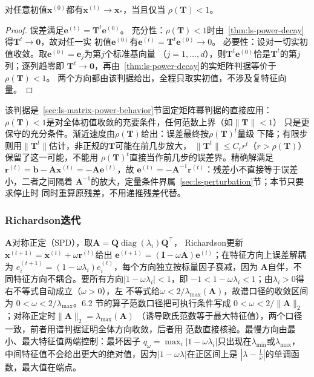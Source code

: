 \begin{theorem}[定常迭代的收敛判据]
\label{thm:ls-stationary-convergence}
对任意初值$\bm x^{(0)}$都有$\bm x^{(t)}\to\bm x_*$，当且仅当
$\rho(\bm T)<1$。
\end{theorem}
\begin{proof}
误差满足$\bm e^{(t)}=\bm T^t\bm e^{(0)}$。
充分性：$\rho(\bm T)<1$时由~\ref{thm:ls-power-decay}得$\bm T^t\to\bm0$，故对任一实
初值$\bm e^{(0)}$有$\bm e^{(t)}=\bm T^t\bm e^{(0)}\to0$。
必要性：设对一切实初值收敛。取$\bm e^{(0)}=\bm e_j$为第$j$个标准基向量
（$j=1,\dots,d$），则$\bm T^t\bm e^{(0)}$恰是$\bm T^t$的第$j$列；逐列趋零即
$\bm T^t\to\bm0$，再由~\ref{thm:ls-power-decay}的实矩阵判据等价于$\rho(\bm T)<1$。
两个方向都由该判据给出，全程只取实初值，不涉及复特征向量。
\end{proof}
该判据是~\ref{sec:ls-matrix-power-behavior}节固定矩阵幂判据的直接应用：
$\rho(\bm T)<1$是对全体初值收敛的充要条件，任何范数上界（如$\lVert\bm T\rVert<1$）
只是更保守的充分条件。渐近速度由$\rho(\bm T)$给出：误差最终按$\rho(\bm T)^t$量级
下降；有限步则用$\lVert\bm T^t\rVert$估计，非正规的$\bm T$可能在前几步放大，
$\lVert\bm T^t\rVert\leq C_r r^t$（$r>\rho(\bm T)$）保留了这一可能，不能用
$\rho(\bm T)^t$直接当作前几步的误差界。精确解满足
$\bm r^{(t)}=\bm b-\bm A\bm x^{(t)}=-\bm A\bm e^{(t)}$，故
$\bm e^{(t)}=-\bm A^{-1}\bm r^{(t)}$：残差小不直接等于误差小，二者之间隔着
$\bm A^{-1}$的放大，定量条件界属~\ref{sec:ls-perturbation}节；本节只要求停止时
同时重算原残差，不用递推残差代替。

\subsubsection{Richardson迭代}

$\bm A$对称正定（SPD），取$\bm A=\bm Q\operatorname{diag}(\lambda_i)\bm Q^{\top}$，
Richardson更新$\bm x^{(t+1)}=\bm x^{(t)}+\omega\bm r^{(t)}$给出
$\bm e^{(t+1)}=(\bm I-\omega\bm A)\bm e^{(t)}$；在特征方向上误差解耦为
$e_i^{(t+1)}=(1-\omega\lambda_i)e_i^{(t)}$，每个方向独立按标量因子衰减，因为
$\bm A$自伴，不同特征方向不耦合。要所有方向$|1-\omega\lambda_i|<1$，即
$-1<1-\omega\lambda_i<1$；由$\lambda_i>0$得右不等式自动成立（$\omega>0$），左
不等式给$\omega<2/\lambda_{\max}(\bm A)$，故谱口径的收敛区间为
$0<\omega<2/\lambda_{\max}$。6.2 节的算子范数口径把可执行条件写成
$0<\omega<2/\lVert\bm A\rVert_2$；对称正定时$\lVert\bm A\rVert_2=\lambda_{\max}(\bm A)$
（诱导欧氏范数等于最大特征值），两个口径一致，前者用谱判据证明全体方向收敛，后者用
范数直接核验。最慢方向由最小、最大特征值两端控制：最坏因子
$q_\omega=\max_i|1-\omega\lambda_i|$只出现在$\lambda_{\min}$或$\lambda_{\max}$，
中间特征值不会给出更大的绝对值，因为$|1-\omega\lambda|$在正区间上是
$|\lambda-\tfrac1\omega|$的单调函数，最大值在端点。

